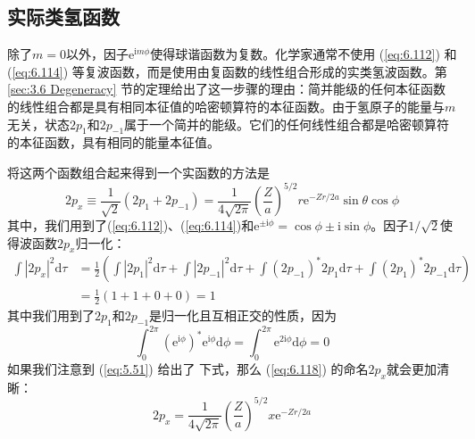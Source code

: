 \subsection*{实际类氢函数}

    除了$m=0$以外，因子$\mathrm{e}^{\mathrm{i}m\phi}$使得球谐函数为复数。化学家通常不使用 (\ref{eq:6.112}) 和 (\ref{eq:6.114}) 等复波函数，而是使用由复函数的线性组合形成的实类氢波函数。第 \ref{sec:3.6 Degeneracy} 节的定理给出了这一步骤的理由：简并能级的任何本征函数的线性组合都是具有相同本征值的哈密顿算符的本征函数。由于氢原子的能量与$m$无关，状态$2p_1$和$2p_{-1}$属于一个简并的能级。它们的任何线性组合都是哈密顿算符的本征函数，具有相同的能量本征值。

    将这两个函数组合起来得到一个实函数的方法是
    \begin{equation}
        2p_x \equiv \frac{1}{\sqrt{2}}\left(2p_1 + 2p_{-1}\right) = \frac{1}{4\sqrt{2\pi}}\left(\frac{Z}{a}\right)^{5/2}r\mathrm{e}^{-Zr/2a}\sin\theta\cos\phi
        \label{eq:6.118}
    \end{equation}
    其中，我们用到了(\ref{eq:6.112})、(\ref{eq:6.114})和$\mathrm{e}^{\pm \mathrm{i}\phi} = \cos\phi \pm \mathrm{i}\sin\phi$。因子$1/\sqrt{2}$使得波函数$2p_x$归一化：
    \begin{equation*}
        \begin{aligned}
            \int\left|2p_x\right|^2\mathrm{d}\tau & = \frac{1}{2}\left(\int\left|2p_1\right|^2\mathrm{d}\tau + \int\left|2p_{-1}\right|^2\mathrm{d}\tau + \int\left(2p_{-1}\right)^{\ast}2p_1\mathrm{d}\tau + \int\left(2p_{1}\right)^{\ast}2p_{-1}\mathrm{d}\tau\right)\\
            & = \frac{1}{2}\left(1 + 1 + 0 + 0\right) = 1
        \end{aligned}
    \end{equation*}
    其中我们用到了$2p_1$和$2p_{-1}$是归一化且互相正交的性质，因为
    \begin{equation*}
        \int_{0}^{2\pi}\left(\mathrm{e}^{\mathrm{i}\phi}\right)^{\ast}\mathrm{e}^{\mathrm{i}\phi}\mathrm{d}\phi = \int_{0}^{2\pi}\mathrm{e}^{2\mathrm{i}\phi}\mathrm{d}\phi = 0
    \end{equation*}
    如果我们注意到 (\ref{eq:5.51}) 给出了 下式，那么 (\ref{eq:6.118}) 的命名$2p_x$就会更加清晰：
    \begin{equation}
        2p_x = \frac{1}{4\sqrt{2\pi}}\left(\frac{Z}{a}\right)^{5/2}x\mathrm{e}^{-Zr/2a}
        \label{eq:6.119}
    \end{equation}

